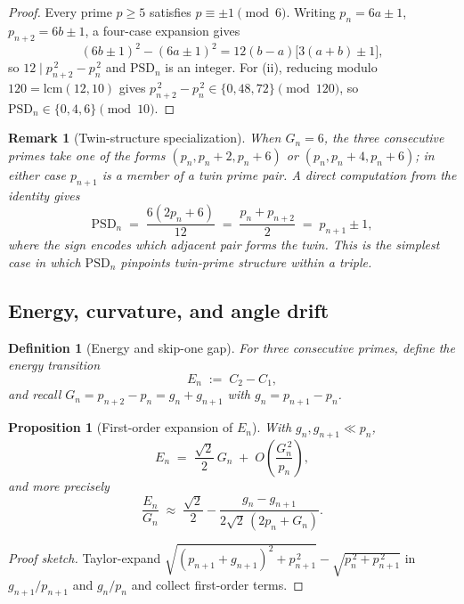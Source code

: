 \documentclass[11pt]{article}
\newtheorem{proposition}[theorem]{Proposition}
\newtheorem{definition}[theorem]{Definition}
\newtheorem{remark}[theorem]{Remark}
\begin{document}
\begin{proof}
Every prime $p \ge 5$ satisfies $p \equiv \pm 1 \pmod 6$. Writing
$p_n = 6a \pm 1$, $p_{n+2} = 6b \pm 1$, a four-case expansion gives
\[
(6b \pm 1)^{2} - (6a \pm 1)^{2} = 12(b - a)\big[3(a+b) \pm 1\big],
\]
so $12 \mid p_{n+2}^{\,2} - p_n^{\,2}$ and $\mathrm{PSD}_n$ is an
integer. For (ii), reducing modulo $120 = \mathrm{lcm}(12, 10)$ gives
$p_{n+2}^{\,2} - p_n^{\,2} \in \{0, 48, 72\} \pmod{120}$, so
$\mathrm{PSD}_n \in \{0, 4, 6\} \pmod{10}$.
\end{proof}

\begin{remark}[Twin-structure specialization]
\label{rem:psd-twin}
When $G_n = 6$, the three consecutive primes take one of the forms
$(p_n, p_n+2, p_n+6)$ or $(p_n, p_n+4, p_n+6)$; in either case
$p_{n+1}$ is a member of a twin prime pair. A direct computation
from the identity gives
\[
\mathrm{PSD}_n \;=\; \frac{6(2p_n + 6)}{12}
\;=\; \frac{p_n + p_{n+2}}{2} \;=\; p_{n+1} \pm 1,
\]
where the sign encodes which adjacent pair forms the twin. This is
the simplest case in which $\mathrm{PSD}_n$ pinpoints twin-prime
structure within a triple.
\end{remark}

\subsection{Energy, curvature, and angle drift}

\begin{definition}[Energy and skip-one gap]
For three consecutive primes, define the \emph{energy transition}
\[
E_n \;:=\; C_2 - C_1,
\]
and recall $G_n = p_{n+2} - p_n = g_n + g_{n+1}$ with $g_n = p_{n+1} - p_n$.
\end{definition}

\begin{proposition}[First-order expansion of $E_n$]\label{prop:energy}
With $g_n, g_{n+1} \ll p_n$,
\[
E_n \;=\; \frac{\sqrt{2}}{2}\,G_n \;+\; O\!\left(\frac{G_n^{\,2}}{p_n}\right),
\]
and more precisely
\[
\frac{E_n}{G_n} \;\approx\; \frac{\sqrt{2}}{2}
- \frac{g_n - g_{n+1}}{2\sqrt{2}\,(2p_n + G_n)}.
\]
\end{proposition}

\begin{proof}[Proof sketch]
Taylor-expand $\sqrt{(p_{n+1}+g_{n+1})^2 + p_{n+1}^{\,2}}
- \sqrt{p_n^{\,2} + p_{n+1}^{\,2}}$ in $g_{n+1}/p_{n+1}$ and
$g_n/p_n$ and collect first-order terms.
\end{proof}
\end{document}
